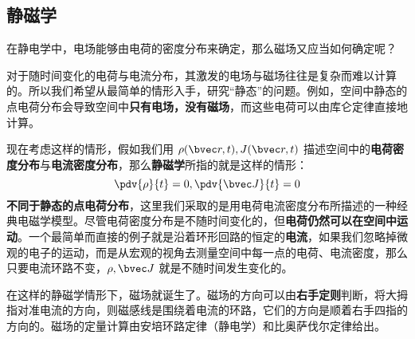 \subsection{静磁学}
在静电学中，电场能够由电荷的密度分布来确定，那么磁场又应当如何确定呢？

对于随时间变化的电荷与电流分布，其激发的电场与磁场往往是复杂而难以计算的。所以我们希望从最简单的情形入手，研究“静态”的问题。例如，空间中静态的点电荷分布会导致空间中\textbf{只有电场，没有磁场}，而这些电荷可以由库仑定律直接地计算。

现在考虑这样的情形，假如我们用 $\rho(\bvec r,t),J(\bvec r,t)$ 描述空间中的\textbf{电荷密度分布}与\textbf{电流密度分布}，那么\textbf{静磁学}所指的就是这样的情形：
\begin{equation}
\pdv{\rho}{t}=0,\pdv{\bvec J}{t}=0
\end{equation}
\textbf{不同于静态的点电荷分布}，这里我们采取的是用电荷电流密度分布所描述的一种经典电磁学模型。尽管电荷密度分布是不随时间变化的，但\textbf{电荷仍然可以在空间中运动}。一个最简单而直接的例子就是沿着环形回路的恒定的\textbf{电流}，如果我们忽略掉微观的电子的运动，而是从宏观的视角去测量空间中每一点的电荷、电流密度，那么只要电流环路不变，$\rho,\bvec J$ 就是不随时间发生变化的。

在这样的静磁学情形下，磁场就诞生了。磁场的方向可以由\textbf{右手定则}判断，将大拇指对准电流的方向，则磁感线是围绕着电流的环路，它们的方向是顺着右手四指的方向的。磁场的定量计算由安培环路定律（静电学）和比奥萨伐尔定律给出。